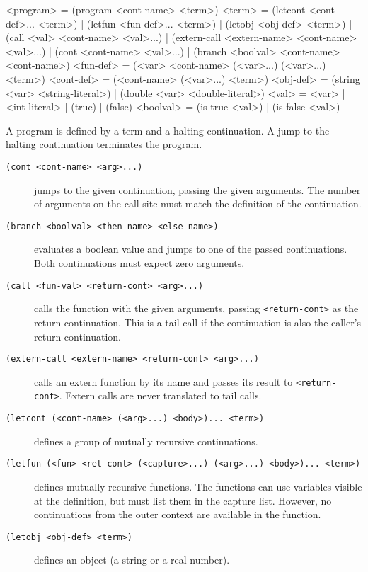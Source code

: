 \begin{gram}
<program>   = (program <cont-name> <term>)
<term>      = (letcont <cont-def>... <term>)
            | (letfun <fun-def>... <term>)
            | (letobj <obj-def> <term>)
            | (call <val> <cont-name> <val>...)
            | (extern-call <extern-name> <cont-name> <val>...)
            | (cont <cont-name> <val>...)
            | (branch <boolval> <cont-name> <cont-name>)
<fun-def>   = (<var> <cont-name> (<var>...) (<var>...) <term>)
<cont-def>  = (<cont-name> (<var>...) <term>)
<obj-def>   = (string <var> <string-literal>)
            | (double <var> <double-literal>)
<val>       = <var> | <int-literal> | (true) | (false)
<boolval>   = (is-true <val>) | (is-false <val>)
\end{gram}

A program is defined by a term and a halting continuation. A jump to the halting
continuation terminates the program.

\begin{description}
\item[\texttt{(cont <cont-name> <arg>...)}] jumps to the given continuation,
  passing the given arguments. The number of arguments on the call site must
  match the definition of the continuation.

\item[\texttt{(branch <boolval> <then-name> <else-name>)}] evaluates a boolean
  value and jumps to one of the passed continuations. Both continuations must
  expect zero arguments.

\item[\texttt{(call <fun-val> <return-cont> <arg>...)}] calls the function with
  the given arguments, passing \texttt{<return-cont>} as the return
  continuation. This is a tail call if the continuation is also the caller's
  return continuation.

\item[\texttt{(extern-call <extern-name> <return-cont> <arg>...)}] calls an
  extern function by its name and passes its result to \texttt{<return-cont>}.
  Extern calls are never translated to tail calls.

\item[\texttt{(letcont (<cont-name> (<arg>...) <body>)... <term>)}] defines
  a group of mutually recursive continuations.

\item[\texttt{(letfun (<fun> <ret-cont> (<capture>...) (<arg>...) <body>)...
  <term>)}] defines mutually recursive functions. The functions can use variables
  visible at the definition, but must list them in the capture list.
  However, no continuations from the outer context are available in the
  function.

\item[\texttt{(letobj <obj-def> <term>)}] defines an object (a string or a real
  number).
\end{description}

